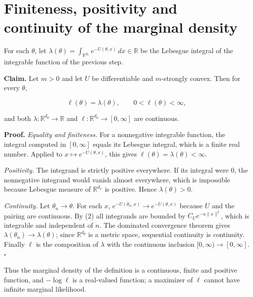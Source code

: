 \documentclass[11pt,a4paper]{article}
\begin{document}
\section{\texorpdfstring{Finiteness, positivity and continuity of the marginal density}{Finiteness, positivity and continuity of the marginal density}}


For each \(\theta\), let \(\lambda(\theta)=\int_{\mathbb R^{d_x}}e^{-U(\theta,x)}\,dx\in\mathbb R\) be the Lebesgue integral of the integrable function of the previous step.




\textbf{Claim.} Let \(m>0\) and let \(U\) be differentiable and \(m\)-strongly convex. Then for every \(\theta\),


\[\ell(\theta)=\lambda(\theta),\qquad0<\ell(\theta)<\infty,\]


and both \(\lambda:\mathbb R^{d_\theta}\to\mathbb R\) and \(\ell:\mathbb R^{d_\theta}\to[0,\infty]\) are continuous.




\textbf{Proof.} \emph{Equality and finiteness.} For a nonnegative integrable function, the integral computed in \([0,\infty]\) equals its Lebesgue integral, which is a finite real number. Applied to \(x\mapsto e^{-U(\theta,x)}\), this gives \(\ell(\theta)=\lambda(\theta)<\infty\).




\emph{Positivity.} The integrand is strictly positive everywhere. If its integral were \(0\), the nonnegative integrand would vanish almost everywhere, which is impossible because Lebesgue measure of \(\mathbb R^{d_x}\) is positive. Hence \(\lambda(\theta)>0\).




\emph{Continuity.} Let \(\theta_n\to\theta\). For each \(x\), \(e^{-U(\theta_n,x)}\to e^{-U(\theta,x)}\) because \(U\) and the pairing are continuous. By (2) all integrands are bounded by \(C_Ue^{-a\|x\|^2}\), which is integrable and independent of \(n\). The dominated convergence theorem gives \(\lambda(\theta_n)\to\lambda(\theta)\); since \(\mathbb R^{d_\theta}\) is a metric space, sequential continuity is continuity. Finally \(\ell\) is the composition of \(\lambda\) with the continuous inclusion \([0,\infty)\to[0,\infty]\). \(\square\)




Thus the marginal density of the definition is a continuous, finite and positive function, and \(-\log\ell\) is a real-valued function; a maximizer of \(\ell\) cannot have infinite marginal likelihood.
\end{document}
